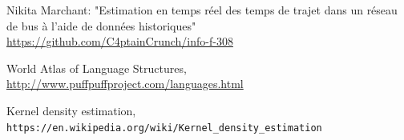 \documentclass[11pt]{article}%
\begin{document}
 
\begin{thebibliography}{9}
 
Nikita Marchant: "Estimation en temps réel des temps de trajet dans un réseau de bus à l'aide de données historiques"
\\\url{https://github.com/C4ptainCrunch/info-f-308}

World Atlas of Language Structures,
\\\url{http://www.puffpuffproject.com/languages.html}

Kernel density estimation,
\\\texttt{https://en.wikipedia.org/wiki/Kernel_density_estimation}



\end{thebibliography}
\end{document}
